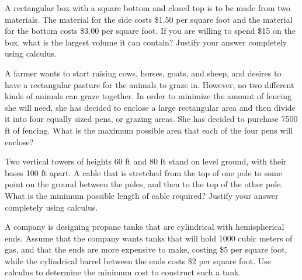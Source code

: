 \begin{exercises} 
	\item A rectangular box with a square bottom and closed top is to be made from two materials.  The material for the side costs \$1.50 per square foot and the material for the bottom costs \$3.00 per square foot.  If you are willing to spend \$15 on the box, what is the largest volume it can contain?  Justify your answer completely using calculus.
	\item A farmer wants to start raising cows, horses, goats, and sheep, and desires to have a rectangular pasture for the animals to graze in.  However, no two different kinds of animals can graze together.  In order to minimize the amount of fencing she will need, she has decided to enclose a large rectangular area and then divide it into four equally sized pens, or grazing areas.  She has decided to purchase 7500 ft of fencing.  What is the maximum possible area that each of the four pens will enclose?
	\item Two vertical towers of heights 60 ft and 80 ft stand on level ground, with their bases 100 ft apart.  A cable that is stretched from the top of one pole to some point on the ground between the poles, and then to the top of the other pole.   What is the minimum possible length of cable required?  Justify your answer completely using calculus.
	\item A company is designing propane tanks that are cylindrical with hemispherical ends.   Assume that the company wants tanks that will hold 1000 cubic meters of gas, and that the ends are more expensive to make, costing \$5 per square foot, while the cylindrical barrel between the ends costs \$2 per square foot.  Use calculus to determine the minimum cost to construct such a tank.
\end{exercises}
\afterexercises